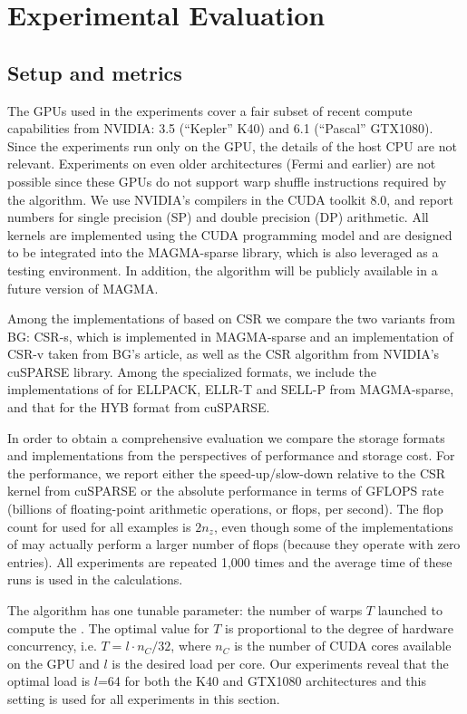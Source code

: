 \section{Experimental Evaluation}
\label{sec:results}

\subsection{Setup and metrics}

The GPUs used in the experiments cover a fair subset
of recent compute capabilities from NVIDIA:
3.5 (``Kepler'' K40) and 6.1 (``Pascal'' GTX1080).
Since the experiments run only on the GPU,
the details of the host CPU are not relevant.
Experiments on even older architectures (Fermi and earlier)
are not possible since these GPUs do not support warp shuffle instructions
required by the \bcsr algorithm.
We use NVIDIA's compilers in the CUDA toolkit 8.0,
and report numbers for single precision (SP)
and double precision (DP) arithmetic.
All kernels are implemented using the CUDA programming model
and are designed to be integrated
into the MAGMA-sparse library,
which is also leveraged as a testing environment.
In addition, the \bcsr algorithm will be publicly available
in a future version of MAGMA.

Among the implementations of \spmv based on CSR
we compare the two variants from BG:
CSR-s, which is implemented in MAGMA-sparse
and an implementation of CSR-v taken from BG's article,
as well as the CSR algorithm from NVIDIA's cuSPARSE library.
Among the specialized formats, we include the implementations of \spmv for
ELLPACK, ELLR-T and SELL-P from MAGMA-sparse,
and that for the HYB format from cuSPARSE.

In order to obtain a comprehensive evaluation
we compare the storage formats and \spmv implementations
from the perspectives of performance and storage cost.
For the performance, we report either the 
speed-up/slow-down relative to the CSR kernel from cuSPARSE
or the absolute performance in terms of GFLOPS rate
(billions of floating-point arithmetic operations, or flops, per second).
The flop count for \spmv used for all examples is $2n_z$,
even though some of the implementations of \spmv
may actually perform a larger number of flops
(because they operate with zero entries).
All experiments are repeated 1,000 times
and the average time of these runs is used in the calculations.

The \bcsr algorithm has one tunable parameter:
the number of warps $T$ launched to compute the \spmv.
The optimal value for $T$ is proportional to the degree of hardware concurrency,
i.e. $T = l \cdot n_C / 32$,
where $n_C$ is the number of CUDA cores available on the GPU
and $l$ is the desired load per core.
Our experiments reveal that the optimal load is $l$=64
for both the K40 and GTX1080 architectures
and this setting is used for all experiments in this section.

